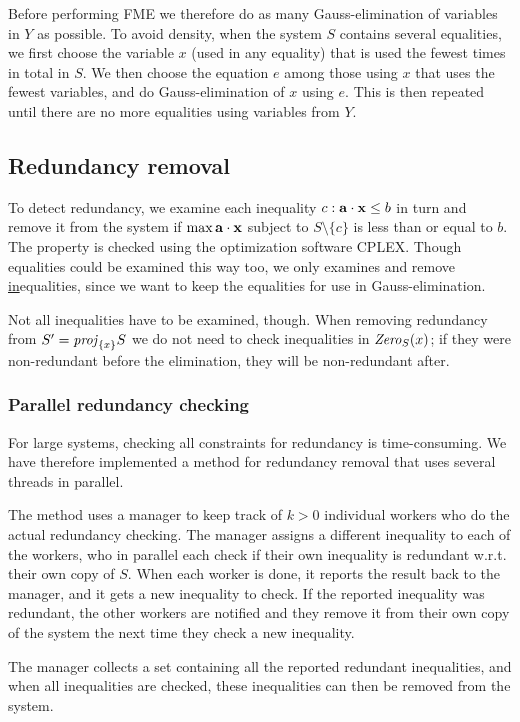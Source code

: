 Before performing FME we therefore do as many Gauss-elimination of variables in $Y$ as possible.
%
To avoid density, when the system $S$ contains several equalities, we first choose the variable $x$ (used in any equality) that is used the fewest times in total in $S$. We then choose the equation $e$ among those using $x$ that uses the fewest variables, and do Gauss-elimination of $x$ using $e$. 
This is then repeated until there are no more equalities using variables from $Y$.
 
\subsection{Redundancy removal}
To detect redundancy, we examine each inequality $c: \mathbf{a}\cdot \mathbf{x}\leq b$ in turn and remove it from the system if $\max \mathbf{a}\cdot \mathbf{x}$ subject to $S\setminus\{c\}$ is less than or equal to $b$. The property is checked using the optimization software CPLEX. Though equalities could be examined this way too, we only examines and remove \underline{in}equalities, since we want to keep the equalities for use in Gauss-elimination.

Not all inequalities have to be examined, though. When removing redundancy from $S' = \mathit{proj}_{\{x\}}S$ we do not need to check inequalities in $\mathit{Zero}_S(x)$; if they were non-redundant before the elimination, they will be non-redundant after.

\subsubsection{Parallel redundancy checking}
For large systems, checking all constraints for redundancy is time-consuming. We have therefore implemented a method for redundancy removal that uses several threads in parallel. 

The method uses a manager to keep track of $k>0$ individual workers who do the actual redundancy checking.
The manager assigns a different inequality to each of the workers, who in parallel each check if their own inequality is redundant w.r.t. their own copy of $S$. When each worker is done, it reports the result back to the manager, and it gets a new inequality to check.  
If the reported inequality was redundant, the other workers are notified and they remove it from their own copy of the system the next time they check a new inequality. 

The manager collects a set containing all the reported redundant inequalities, and when all inequalities are checked, these inequalities can then be removed from the system.

